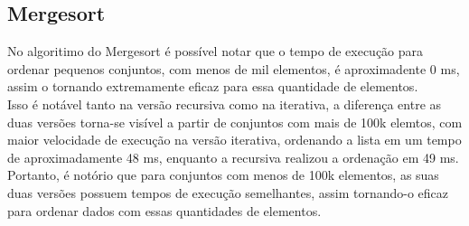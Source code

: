 \subsection{Mergesort}

No algoritimo do Mergesort é possível notar que o tempo de execução para ordenar pequenos conjuntos, com menos de mil elementos, é aproximadente 0 ms, assim o tornando extremamente eficaz para essa quantidade de elementos. \\

Isso é notável tanto na versão recursiva como na iterativa, a diferença entre as duas versões torna-se visível a partir de conjuntos com mais de 100k elemtos, com maior velocidade de execução na versão iterativa, ordenando a lista em um tempo de aproximadamente 48 ms, enquanto a recursiva realizou a ordenação em 49 ms. \\

Portanto, é notório que para conjuntos com menos de 100k elementos, as suas duas versões possuem tempos de execução semelhantes, assim tornando-o eficaz para ordenar dados com essas quantidades de elementos.